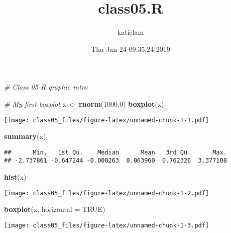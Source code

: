 \documentclass[]{article}
\title{class05.R}
\author{katielam}
\date{Thu Jan 24 09:35:24 2019}
\newenvironment{Shaded}{\begin{snugshade}}{\end{snugshade}}
\newcommand{\KeywordTok}[1]{\textcolor[rgb]{0.13,0.29,0.53}{\textbf{#1}}}
\newcommand{\DataTypeTok}[1]{\textcolor[rgb]{0.13,0.29,0.53}{#1}}
\newcommand{\DecValTok}[1]{\textcolor[rgb]{0.00,0.00,0.81}{#1}}
\newcommand{\StringTok}[1]{\textcolor[rgb]{0.31,0.60,0.02}{#1}}
\newcommand{\CommentTok}[1]{\textcolor[rgb]{0.56,0.35,0.01}{\textit{#1}}}
\newcommand{\OtherTok}[1]{\textcolor[rgb]{0.56,0.35,0.01}{#1}}
\newcommand{\NormalTok}[1]{#1}
\begin{document}
\maketitle

\begin{Shaded}
\begin{Highlighting}[]
\CommentTok{# Class 05 R graphic intro}

\CommentTok{# My first boxplot}
\NormalTok{x <-}\StringTok{ }\KeywordTok{rnorm}\NormalTok{(}\DecValTok{1000}\NormalTok{,}\DecValTok{0}\NormalTok{)}
\KeywordTok{boxplot}\NormalTok{(x) }
\end{Highlighting}
\end{Shaded}

\texttt{[image: class05\_files/figure-latex/unnamed-chunk-1-1.pdf]}

\begin{Shaded}
\begin{Highlighting}[]
\KeywordTok{summary}\NormalTok{(x)}
\end{Highlighting}
\end{Shaded}

\begin{verbatim}
##      Min.   1st Qu.    Median      Mean   3rd Qu.      Max. 
## -2.737861 -0.647244 -0.000263  0.063960  0.762326  3.377108
\end{verbatim}

\begin{Shaded}
\begin{Highlighting}[]
\KeywordTok{hist}\NormalTok{(x)}
\end{Highlighting}
\end{Shaded}

\texttt{[image: class05\_files/figure-latex/unnamed-chunk-1-2.pdf]}

\begin{Shaded}
\begin{Highlighting}[]
\KeywordTok{boxplot}\NormalTok{(x, }\DataTypeTok{horizontal =} \OtherTok{TRUE}\NormalTok{)}
\end{Highlighting}
\end{Shaded}

\texttt{[image: class05\_files/figure-latex/unnamed-chunk-1-3.pdf]}
\end{document}
